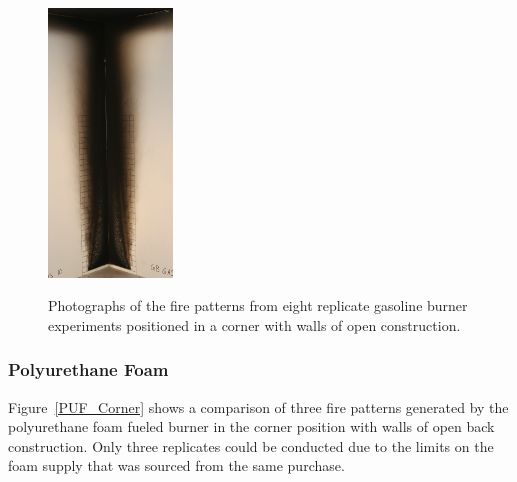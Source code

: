 \documentclass[twoside]{uocthesis}
\begin{document}
\begin{figure}[p]
	\includegraphics[width=1.3in]{../Figures/GBGas10C_IMG_9818} \\

	\caption[Photographs of the fire patterns from eight replicate gasoline burner experiments positioned in a corner]{Photographs of the fire patterns from eight replicate gasoline burner experiments positioned in a corner with walls of open construction.}
	\label{Gas_Corner}
\end{figure}


\subsubsection{Polyurethane Foam}

Figure~\ref{PUF_Corner} shows a comparison of three fire patterns generated by the polyurethane foam fueled burner in the corner position with walls of open back construction. Only three replicates could be conducted due to the limits on the foam supply that was sourced from the same purchase.  
\end{document}
